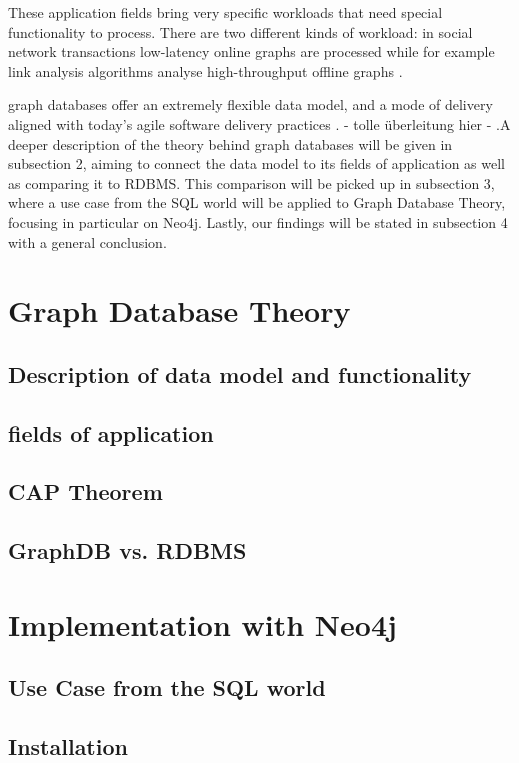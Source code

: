 These application fields bring very specific workloads that need special functionality to process. There are two different kinds of workload: in social network transactions low-latency online graphs are processed while for example link analysis algorithms analyse high-throughput offline graphs \cite{Angles2018AnIT}.

graph databases offer an extremely flexible data model, and a mode of delivery aligned with today’s agile software delivery practices \cite{Robinson2013}. - tolle überleitung hier - .A deeper description of the theory behind graph databases will be given in subsection 2, aiming to connect the data model to its fields of application as well as comparing it to RDBMS. This comparison will be picked up in subsection 3, where a use case from the SQL world will be applied to Graph Database Theory, focusing in particular on Neo4j. Lastly, our findings will be stated in subsection 4 with a general conclusion.


\section{Graph Database Theory}
\subsection{Description of data model and functionality}
\subsection{fields of application}
\subsection{CAP Theorem}
\subsection{GraphDB vs. RDBMS}

\section{Implementation with Neo4j}
\subsection{Use Case from the SQL world}
\subsection{Installation}
